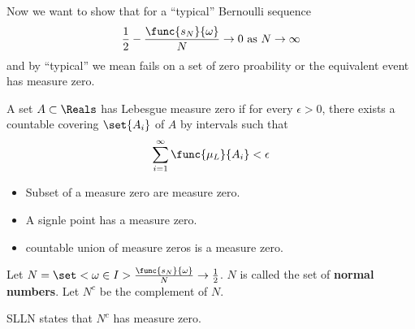 Now we want to show that for a ``typical'' Bernoulli sequence 
\begin{equation}\label{eq:typicalBernoulli}
    \dfrac{1}{2} - \dfrac{\func{s_N}{\omega}}{N} \to 0 \ \mathrm{as} \ N \to \infty
\end{equation}
and by ``typical'' we mean  fails on a set of zero proability or the equivalent event has measure zero.
\begin{definition}
    A set \(A \subset \Reals\) has Lebesgue measure zero if for every \(\epsilon > 0\), there exists a countable covering \(\set{A_i}\) of \(A\) by intervals such that 
    \begin{equation*}
        \sum_{i = 1}^{\infty} \func{\mu_L}{A_i} < \epsilon
    \end{equation*}
\end{definition}
\begin{itemize}
    \item Subset of a measure zero are measure zero.
    \item A signle point has a measure zero.
    \item countable union of measure zeros is a measure zero.
\end{itemize}

Let \(N = \set<\omega \in I>{ \frac{\func{s_N}{\omega}}{N} \to \frac{1}{2}}\). \(N\) is called the set of \textbf{normal numbers}. Let \(N^c\) be the complement of \(N\).
\begin{theorem}
    SLLN states that \(N^c\) has measure zero.
\end{theorem}

